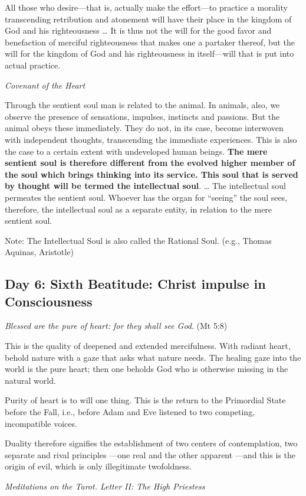 \begin{quotationx}
All those who desire—that is, actually make the effort—to practice a morality
transcending retribution and atonement will have their place in the kingdom of God and his righteousness … It is thus
not the will for the good favor and benefaction of merciful righteousness that makes one a partaker thereof, but the
will for the kingdom of God and his righteousness in itself—will that is put into actual practice.
\begin{flushright}\textit{Covenant of the Heart}\end{flushright}

\end{quotationx}
Through the sentient soul man is related to the animal. In animals, also, we observe the presence of sensations,
impulses, instincts and passions. But the animal obeys these immediately. They do not, in its case, become interwoven
with independent thoughts, transcending the immediate experiences. This is also the case to a certain extent with
undeveloped human beings. \textbf{The mere sentient soul is therefore different from the evolved higher member of the
soul which brings thinking into its service. This soul that is served by thought will be termed the intellectual soul}.
… The intellectual soul permeates the sentient soul. Whoever has the organ for “seeing” the soul sees, therefore, the
intellectual soul as a separate entity, in relation to the mere sentient soul.

Note: The Intellectual Soul is also called the Rational Soul. (e.g., Thomas Aquinas, Aristotle)

\subsection*{Day 6: Sixth Beatitude: Christ impulse in Consciousness}
\emph{Blessed are the pure of heart: for they shall see God}. (Mt 5:8)

This is the quality of deepened and extended mercifulness. With radiant heart, behold nature with a gaze that asks what
nature needs. The healing gaze into the world is the pure heart; then one beholds God who is otherwise missing in the
natural world.

Purity of heart is to will one thing. This is the return to the Primordial State before the Fall, i.e., before Adam and
Eve listened to two competing, incompatible voices.

\begin{quotationx}
Duality therefore signifies the establishment of two centers of contemplation, two separate and rival principles
—one real and the other apparent —and this is the origin of evil, which is
only illegitimate twofoldness. 
\begin{flushright}\textit{Meditations on the Tarot. Letter II: The High Priestess}\end{flushright}

\end{quotationx}

